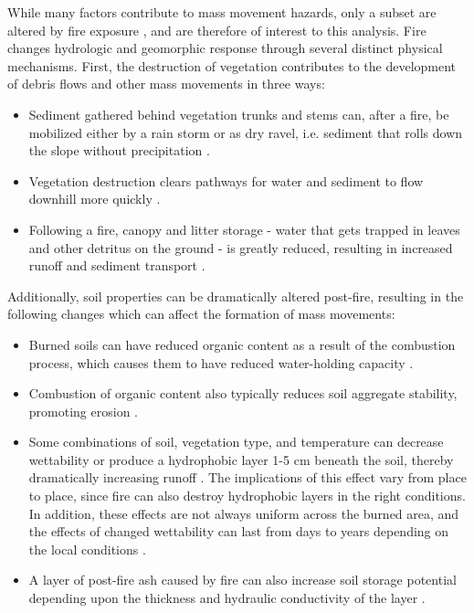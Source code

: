 \documentclass[nhess, manuscript]{copernicus}
\begin{document}
While many factors contribute to mass movement hazards, only a subset are altered by fire
exposure \citep{highlandLandslideHandbookGuide2008}, and are therefore of interest to this
analysis. Fire changes hydrologic and geomorphic response through several distinct physical mechanisms. First, the
destruction of vegetation contributes to the development of debris flows
and other mass movements in three ways:

\begin{itemize}
\item
  Sediment gathered behind vegetation trunks and stems can, after 
  a fire, be mobilized  either by a rain storm or as dry ravel, i.e. sediment
  that rolls down the slope without precipitation \citep{cannonWildfirerelatedDebrisFlow2005}.
\item
  Vegetation destruction clears pathways for water and sediment to flow
  downhill more quickly \citep{shakesbyWildfireHydrologicalGeomorphological2006}.
\item
  Following a fire, canopy and litter storage - water
  that gets trapped in leaves and other detritus on the ground - is
  greatly reduced, resulting in increased runoff and sediment
  transport \citep{cannonWildfirerelatedDebrisFlow2005, shakesbyWildfireHydrologicalGeomorphological2006}.
\end{itemize}

Additionally, soil properties can be dramatically altered post-fire, resulting in
the following changes which can affect the formation of
mass movements:

\begin{itemize}
\item
    Burned soils can have reduced organic content as a result of the
    combustion process, which causes them to have reduced water-holding
    capacity \citep{nearyWildlandFireEcosystems2005}.
\item
    Combustion of organic content also typically reduces soil aggregate
    stability, promoting erosion \citep{shakesbyWildfireHydrologicalGeomorphological2006}.
\item
    Some combinations of soil, vegetation type, and temperature can
    decrease wettability or produce a hydrophobic layer 1-5 cm beneath the
    soil, thereby dramatically increasing runoff \citep{spittlerFireDebrisFlow1995}. The
    implications of this effect vary from place to place,
    since fire can also destroy hydrophobic layers in the right conditions. 
    In addition, these effects are not always
    uniform across the burned area, and the effects of changed wettability
    can last from days to years depending on the local conditions
    \citep{shakesbyWildfireHydrologicalGeomorphological2006}.
\item
    A layer of post-fire ash caused by fire can also increase soil storage potential depending 
    upon the thickness and hydraulic conductivity of the layer \citep{ebelHydrologicConditionsControlling2012}.
\end{itemize}
\end{document}
